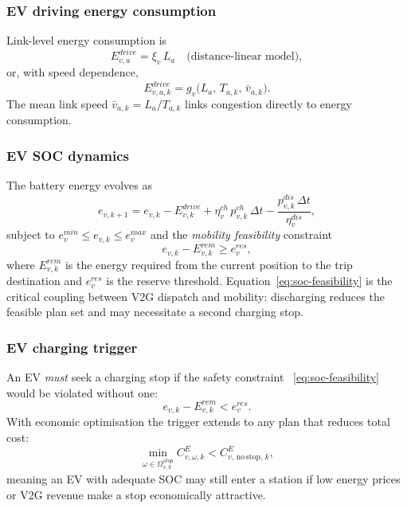 \subsubsection{EV driving energy consumption}

Link-level energy consumption is
\begin{equation}
  E^{drive}_{v,a} = \xi_v\, L_a
  \quad\text{(distance-linear model)},
  \label{eq:ev-energy-linear}
\end{equation}
or, with speed dependence,
\begin{equation}
  E^{drive}_{v,a,k} = g_v\!\bigl(L_a,\, T_{a,k},\, \bar{v}_{a,k}\bigr).
  \label{eq:ev-energy-speed}
\end{equation}
The mean link speed $\bar{v}_{a,k} = L_a / T_{a,k}$ links congestion
directly to energy consumption.

\subsubsection{EV SOC dynamics}

The battery energy evolves as
\begin{equation}
  e_{v,k+1} = e_{v,k}
    - E^{drive}_{v,k}
    + \eta^{ch}_v\, p^{ch}_{v,k}\,\Delta t
    - \frac{p^{dis}_{v,k}\,\Delta t}{\eta^{dis}_v},
  \label{eq:soc-evolution}
\end{equation}
subject to $e^{min}_v \le e_{v,k} \le e^{max}_v$ and the
\emph{mobility feasibility} constraint
\begin{equation}
  e_{v,k} - E^{rem}_{v,k} \ge e^{res}_v,
  \label{eq:soc-feasibility}
\end{equation}
where $E^{rem}_{v,k}$ is the energy required from the current position
to the trip destination and $e^{res}_v$ is the reserve threshold.
Equation~\eqref{eq:soc-feasibility} is the critical coupling between
V2G dispatch and mobility: discharging reduces the feasible plan set
and may necessitate a second charging stop.

\subsubsection{EV charging trigger}

An EV \emph{must} seek a charging stop if the safety constraint~%
\eqref{eq:soc-feasibility} would be violated without one:
\begin{equation}
  e_{v,k} - E^{rem}_{v,k} < e^{res}_v.
  \label{eq:charging-trigger-hard}
\end{equation}
With economic optimisation the trigger extends to any plan that
reduces total cost:
\begin{equation}
  \min_{\omega \in \Omega^{stop}_{v,k}} C^E_{v,\omega,k}
  < C^E_{v,\,\mathrm{no\,stop},\,k},
  \label{eq:charging-trigger-economic}
\end{equation}
meaning an EV with adequate SOC may still enter a station if low energy
prices or V2G revenue make a stop economically attractive.

